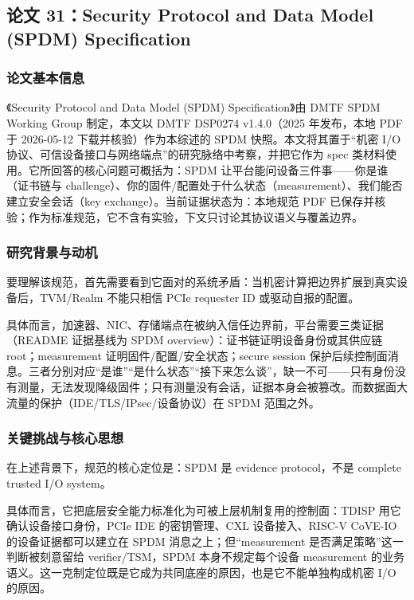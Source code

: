 \documentclass[11pt]{ctexart}
\begin{document}
\subsection{论文 31：Security Protocol and Data Model (SPDM) Specification}
\subsubsection{论文基本信息}
《Security Protocol and Data Model (SPDM) Specification》由 DMTF SPDM Working Group 制定，本文以 DMTF DSP0274 v1.4.0（2025 年发布，本地 PDF 于 2026-05-12 下载并核验）作为本综述的 SPDM 快照。本文将其置于“机密 I/O 协议、可信设备接口与网络端点”的研究脉络中考察，并把它作为 spec 类材料使用。它所回答的核心问题可概括为：SPDM 让平台能问设备三件事——你是谁（证书链与 challenge）、你的固件/配置处于什么状态（measurement）、我们能否建立安全会话（key exchange）。当前证据状态为：本地规范 PDF 已保存并核验；作为标准规范，它不含有实验，下文只讨论其协议语义与覆盖边界。\cite{dmtf_spdm_2025}\par
\subsubsection{研究背景与动机}
要理解该规范，首先需要看到它面对的系统矛盾：当机密计算把边界扩展到真实设备后，TVM/Realm 不能只相信 PCIe requester ID 或驱动自报的配置。\par
具体而言，加速器、NIC、存储端点在被纳入信任边界前，平台需要三类证据（README 证据基线为 SPDM overview）：证书链证明设备身份或其供应链 root；measurement 证明固件/配置/安全状态；secure session 保护后续控制面消息。三者分别对应“是谁”“是什么状态”“接下来怎么谈”，缺一不可——只有身份没有测量，无法发现降级固件；只有测量没有会话，证据本身会被篡改。而数据面大流量的保护（IDE/TLS/IPsec/设备协议）在 SPDM 范围之外。\par
\subsubsection{关键挑战与核心思想}
在上述背景下，规范的核心定位是：SPDM 是 evidence protocol，不是 complete trusted I/O system。\par
具体而言，它把底层安全能力标准化为可被上层机制复用的控制面：TDISP 用它确认设备接口身份，PCIe IDE 的密钥管理、CXL 设备接入、RISC-V CoVE-IO 的设备证据都可以建立在 SPDM 消息之上；但“measurement 是否满足策略”这一判断被刻意留给 verifier/TSM，SPDM 本身不规定每个设备 measurement 的业务语义。这一克制定位既是它成为共同底座的原因，也是它不能单独构成机密 I/O 的原因。\par
\end{document}
